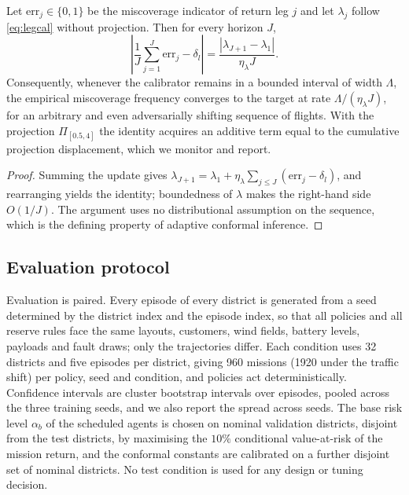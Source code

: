 \begin{proposition}
\label{prop:coverage}
Let $\mathrm{err}_j\in\{0,1\}$ be the miscoverage indicator of return leg $j$ and let $\lambda_j$ follow \eqref{eq:legcal} without projection. Then for every horizon $J$,
\begin{equation}
\left|\frac{1}{J}\sum_{j=1}^{J}\mathrm{err}_j - \delta_l\right| = \frac{|\lambda_{J+1}-\lambda_1|}{\eta_\lambda J}.
\end{equation}
Consequently, whenever the calibrator remains in a bounded interval of width $\Lambda$, the empirical miscoverage frequency converges to the target at rate $\Lambda/(\eta_\lambda J)$, for an arbitrary and even adversarially shifting sequence of flights. With the projection $\Pi_{[0.5,4]}$ the identity acquires an additive term equal to the cumulative projection displacement, which we monitor and report.
\end{proposition}

\begin{proof}
Summing the update gives $\lambda_{J+1}=\lambda_1+\eta_\lambda\sum_{j\le J}(\mathrm{err}_j-\delta_l)$, and rearranging yields the identity; boundedness of $\lambda$ makes the right-hand side $O(1/J)$. The argument uses no distributional assumption on the sequence, which is the defining property of adaptive conformal inference\cite{gibbs2021aci}.
\end{proof}

\subsection*{Evaluation protocol}

Evaluation is paired. Every episode of every district is generated from a seed determined by the district index and the episode index, so that all policies and all reserve rules face the same layouts, customers, wind fields, battery levels, payloads and fault draws; only the trajectories differ. Each condition uses 32 districts and five episodes per district, giving 960 missions (1920 under the traffic shift) per policy, seed and condition, and policies act deterministically. Confidence intervals are cluster bootstrap intervals over episodes, pooled across the three training seeds, and we also report the spread across seeds. The base risk level $\alpha_b$ of the scheduled agents is chosen on nominal validation districts, disjoint from the test districts, by maximising the $10\%$ conditional value-at-risk of the mission return, and the conformal constants are calibrated on a further disjoint set of nominal districts. No test condition is used for any design or tuning decision.

